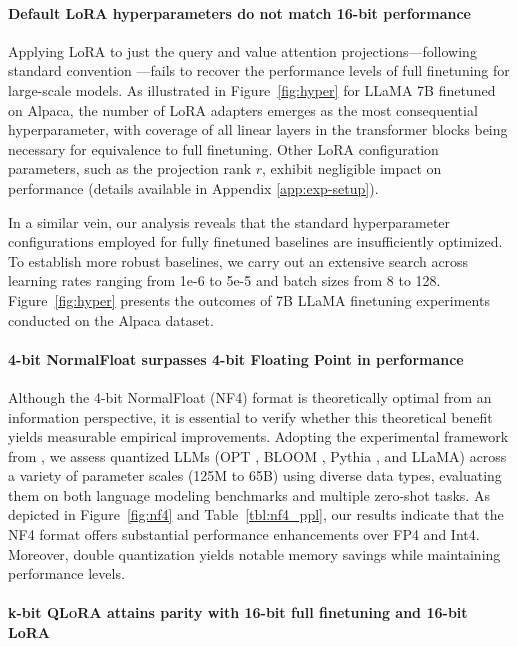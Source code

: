 \paragraph{Default LoRA hyperparameters do not match 16-bit performance} 

Applying LoRA to just the query and value attention projections—following standard convention \citep{hu2021lora}—fails to recover the performance levels of full finetuning for large-scale models. As illustrated in Figure~\ref{fig:hyper} for LLaMA 7B finetuned on Alpaca, the number of LoRA adapters emerges as the most consequential hyperparameter, with coverage of all linear layers in the transformer blocks being necessary for equivalence to full finetuning. Other LoRA configuration parameters, such as the projection rank $r$, exhibit negligible impact on performance (details available in Appendix \ref{app:exp-setup}).

In a similar vein, our analysis reveals that the standard hyperparameter configurations employed for fully finetuned baselines are insufficiently optimized. To establish more robust baselines, we carry out an extensive search across learning rates ranging from 1e-6 to 5e-5 and batch sizes from 8 to 128. Figure~\ref{fig:hyper} presents the outcomes of 7B LLaMA finetuning experiments conducted on the Alpaca dataset.

\paragraph{4-bit NormalFloat surpasses 4-bit Floating Point in performance}

Although the 4-bit NormalFloat (NF4) format is theoretically optimal from an information perspective, it is essential to verify whether this theoretical benefit yields measurable empirical improvements. Adopting the experimental framework from \citet{dettmers2022case}, we assess quantized LLMs (OPT \citep{zhang2022opt}, BLOOM \cite{scao2022bloom}, Pythia \cite{biderman2023pythia}, and LLaMA) across a variety of parameter scales (125M to 65B) using diverse data types, evaluating them on both language modeling benchmarks and multiple zero-shot tasks. As depicted in Figure~\ref{fig:nf4} and Table~\ref{tbl:nf4_ppl}, our results indicate that the NF4 format offers substantial performance enhancements over FP4 and Int4. Moreover, double quantization yields notable memory savings while maintaining performance levels.

\paragraph{k-bit \textsc{QLoRA} attains parity with 16-bit full finetuning and 16-bit LoRA}

